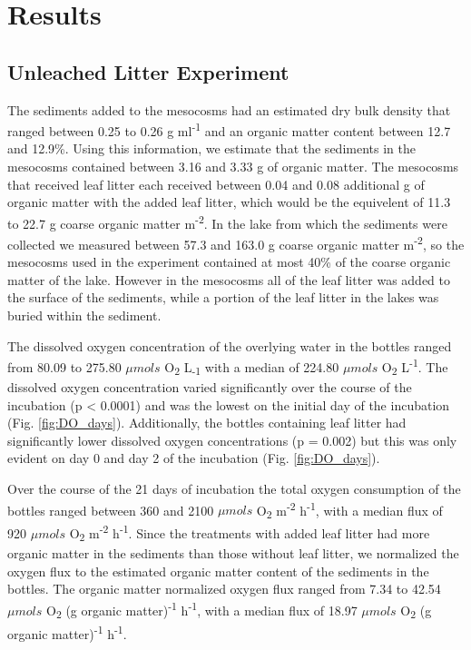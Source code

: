 \section{Results}
\subsection{Unleached Litter Experiment}
The sediments added to the mesocosms had an estimated dry bulk density that ranged between 0.25 to 0.26 g ml\textsuperscript{-1} and an organic matter content between 12.7 and 12.9\%. Using this information, we estimate that the sediments in the mesocosms contained between 3.16 and 3.33 g of organic matter.  The mesocosms that received leaf litter each received between 0.04 and 0.08 additional g of organic matter with the added leaf litter, which would be the equivelent of 11.3 to 22.7 g coarse organic matter m\textsuperscript{-2}. In the lake from which the sediments were collected we measured between 57.3 and 163.0 g coarse organic matter m\textsuperscript{-2}, so the mesocosms used in the experiment contained at most 40\% of the coarse organic matter of the lake. However in the mesocosms all of the leaf litter was added to the surface of the sediments, while a portion of the leaf litter in the lakes was buried within the sediment.

The dissolved oxygen concentration of the overlying water in the bottles ranged from 80.09 to 275.80 $\mu mols$ O\textsubscript{2} L\textsubscript{-1} with a median of 224.80 $\mu mols$ O\textsubscript{2} L\textsuperscript{-1}.  The dissolved oxygen concentration varied significantly over the course of the incubation (p < 0.0001) and was the lowest on the initial day of the incubation (Fig. \ref{fig:DO_days}). Additionally, the bottles containing leaf litter had significantly lower dissolved oxygen concentrations (p = 0.002) but this was only evident on day 0 and day 2 of the incubation (Fig. \ref{fig:DO_days}).

Over the course of the 21 days of incubation the total oxygen consumption of the bottles ranged between 360 and 2100 $\mu mols$ O\textsubscript{2} m\textsuperscript{-2} h\textsuperscript{-1}, with a median flux of 920 $\mu mols$ O\textsubscript{2} m\textsuperscript{-2} h\textsuperscript{-1}. Since the treatments with added leaf litter had more organic matter in the sediments than those without leaf litter, we normalized the oxygen flux to the estimated organic matter content of the sediments in the bottles. The organic matter normalized oxygen flux ranged from 7.34 to 42.54 $\mu mols$ O\textsubscript{2} (g organic matter)\textsuperscript{-1} h\textsuperscript{-1}, with a median flux of 18.97 $\mu mols$ O\textsubscript{2} (g organic matter)\textsuperscript{-1} h\textsuperscript{-1}.

